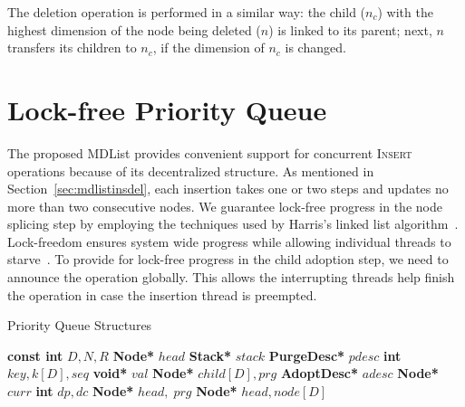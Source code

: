 \documentclass[10pt,journal,letterpaper,compsoc]{IEEEtran}
\begin{document}
The deletion operation is performed in a similar way: the child ($n_c$) with the highest dimension of the node being deleted ($n$) is linked to its parent; next, $n$ transfers its children to $n_c$, if the dimension of $n_c$ is changed.


\section{Lock-free Priority Queue}
\label{sec:cpqueue}
The proposed MDList provides convenient support for concurrent \textsc{Insert} operations because of its decentralized structure.
As mentioned in Section~\ref{sec:mdlistinsdel}, each insertion takes one or two steps and updates no more than two consecutive nodes.
We guarantee lock-free progress in the node splicing step by employing the techniques used by Harris's linked list algorithm~\cite{harris2001pragmatic}. 
Lock-freedom ensures system wide progress while allowing individual threads to starve~\cite{herlihy2012art}.
To provide for lock-free progress in the child adoption step, we need to announce the operation globally. 
This allows the interrupting threads help finish the operation in case the insertion thread is preempted.

\setlength{\columnsep}{8pt}
\begin{algorithm}[ht]
    \caption{Priority Queue Structures}
    \label{alg:pqstructure}
    \vspace{-0.1in}
    \begin{multicols}{2}
        \begin{algorithmic}[1]
            \State \textbf{const int} $D,N,R$
            \State \textbf{Node*} $head$
            \State \textbf{Stack*} $stack$
            \State \textbf{PurgeDesc*} $pdesc$
            \EndClass
            \Statex
            \State \textbf{int} $key, k[D], seq$
            \State \textbf{void*} $val$
            \State \textbf{Node*} $child[D], prg$
            \State \textbf{AdoptDesc*} $adesc$
            \EndStruct
            \State \textbf{Node*} $curr$
            \State \textbf{int} $dp,dc$ 
            \EndStruct
            \Statex
            \State \textbf{Node*} $head,\;prg$
            \EndStruct
            \Statex
            \State \textbf{Node*} $head, node[D]$
            \EndStruct
            \Statex
        \end{algorithmic}
    \end{multicols}
    \vspace{-0.1in}
\end{algorithm}
\end{document}
